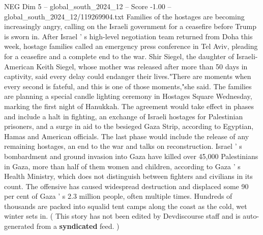 \begin{textsample}{NEG Dim 5 – global\_south\_2024\_12 – Score -1.00 – global\_south\_2024\_12/119269904.txt}
Families of the hostages are becoming increasingly angry, calling on the Israeli government for a ceasefire before Trump is sworn in.
After Israel ' s high-level negotiation team returned from Doha this week, hostage families called an emergency press conference in Tel Aviv, pleading for a ceasefire and a complete end to the war.
Shir Siegel, the daughter of Israeli-American Keith Siegel, whose mother was released after more than 50 days in captivity, said every delay could endanger their lives."There are moments when every second is fateful, and this is one of those moments,"she said.
The families are planning a special candle lighting ceremony in Hostages Square Wednesday, marking the first night of Hanukkah.
The agreement would take effect in phases and include a halt in fighting, an exchange of Israeli hostages for Palestinian prisoners, and a surge in aid to the besieged Gaza Strip, according to Egyptian, Hamas and American officials.
The last phase would include the release of any remaining hostages, an end to the war and talks on reconstruction.
Israel ' s bombardment and ground invasion into Gaza have killed over 45,000 Palestinians in Gaza, more than half of them women and children, according to Gaza ' s Health Ministry, which does not distinguish between fighters and civilians in its count.
The offensive has caused widespread destruction and displaced some 90 per cent of Gaza ' s 2.3 million people, often multiple times.
Hundreds of thousands are packed into squalid tent camps along the coast as the cold, wet winter sets in. ( This story has not been edited by Devdiscourse staff and is auto-generated from a \textbf{syndicated} feed. )

\end{textsample}
